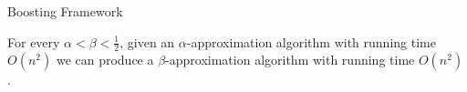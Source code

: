 \begin{frame}{Boosting Framework}
    \begin{Theorem}
        For every $\alpha < \beta < \frac{1}{2}$, given an $\alpha$-approximation 
        algorithm with running time $O(n^2)$ we can produce a $\beta$-approximation algorithm 
        with running time $O(n^2)$.
    \end{Theorem}
\end{frame}